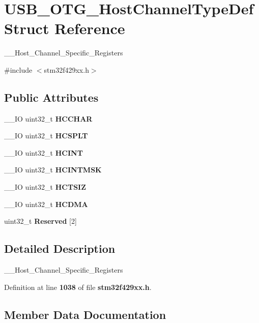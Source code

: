 \section{U\+S\+B\+\_\+\+O\+T\+G\+\_\+\+Host\+Channel\+Type\+Def Struct Reference}
\label{structUSB__OTG__HostChannelTypeDef}


\+\_\+\+\_\+\+Host\+\_\+\+Channel\+\_\+\+Specific\+\_\+\+Registers  




{\ttfamily \#include $<$stm32f429xx.\+h$>$}

\subsection*{Public Attributes}
\begin{DoxyCompactItemize}
\item 
\+\_\+\+\_\+\+IO uint32\+\_\+t \textbf{ H\+C\+C\+H\+AR}
\item 
\+\_\+\+\_\+\+IO uint32\+\_\+t \textbf{ H\+C\+S\+P\+LT}
\item 
\+\_\+\+\_\+\+IO uint32\+\_\+t \textbf{ H\+C\+I\+NT}
\item 
\+\_\+\+\_\+\+IO uint32\+\_\+t \textbf{ H\+C\+I\+N\+T\+M\+SK}
\item 
\+\_\+\+\_\+\+IO uint32\+\_\+t \textbf{ H\+C\+T\+S\+IZ}
\item 
\+\_\+\+\_\+\+IO uint32\+\_\+t \textbf{ H\+C\+D\+MA}
\item 
uint32\+\_\+t \textbf{ Reserved} [2]
\end{DoxyCompactItemize}


\subsection{Detailed Description}
\+\_\+\+\_\+\+Host\+\_\+\+Channel\+\_\+\+Specific\+\_\+\+Registers 

Definition at line \textbf{ 1038} of file \textbf{ stm32f429xx.\+h}.



\subsection{Member Data Documentation}
\mbox{\label{structUSB__OTG__HostChannelTypeDef_ac1d0619a44758dcaeeda5c0b9c22f784}} 
